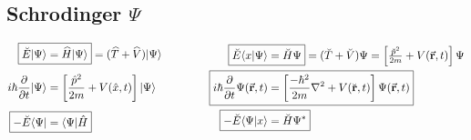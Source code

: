 \documentclass[12pt]{article}
\begin{document}
\subsection{Schrodinger \( \Psi \)}

\vspace{5pt}\noindent
\[ 
    \begin{aligned}
        \Aboxed{ \breve{E} | \Psi \rangle 
            & = \widehat{H} | \Psi \rangle }
            = ( \widehat{T} + \widehat{V} ) | \Psi \rangle
            \\[5pt]
        i\hbar \frac{\partial}{\partial t} | \Psi \rangle 
            & = \left[ \frac{\hat{p}^2}{2m} + V(\hat{x}, t) \right] | \Psi \rangle
            \\[5pt]
        \Aboxed{ - \breve{E} \langle \Psi | 
            & = \langle \Psi | \hat{H} }
    \end{aligned}
    \hspace{1.5cm}
    \begin{aligned}
        \Aboxed{ \breve{E} \langle x | \Psi \rangle &= \breve{H} \Psi } = ( \breve{T} + \breve{V} ) \Psi
            = \left[ \tfrac{ \breve{p}^2 }{2m} + V(\vec{\mathbf{r}},t) \right] \Psi
            \\
        \Aboxed{ i \hbar \frac{\partial}{\partial t} \Psi(\vec{\mathbf{r}},t) 
            & = \left[ \frac{-\hbar^2}{2m} \nabla^2 
            + V(\breve{\mathbf{r}},t) \right] \Psi(\vec{\mathbf{r}},t) }
            \\
        \Aboxed{ - \breve{E} \langle \Psi | x \rangle
            & = \breve{H} \Psi^* }
    \end{aligned} 
\]
\end{document}
